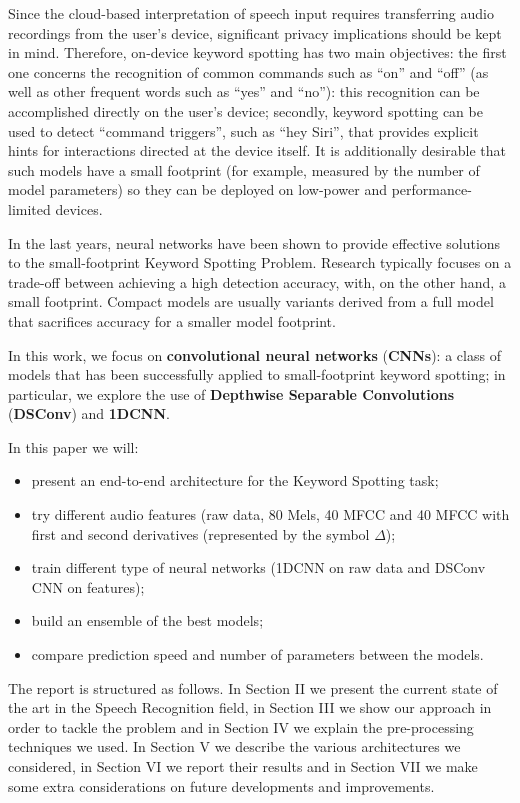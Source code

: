 \documentclass[conference]{IEEEtran}
\begin{document}
Since the cloud-based interpretation of speech input requires transferring audio recordings from the user’s device, significant privacy implications should be kept in mind. Therefore, on-device keyword spotting has two main objectives: the first one concerns the recognition of common commands such as “on” and “off” (as well as other frequent words such as “yes” and “no”): this recognition can be accomplished directly on the user’s device; secondly, keyword spotting can be used to detect “command triggers”, such as “hey Siri”, that provides explicit hints for interactions directed at the device itself. It is additionally desirable that such models have a small footprint (for example, measured by the number of model parameters) so they can be deployed on low-power and performance-limited devices.

In the last years, neural networks have been shown to provide effective solutions to the small-footprint Keyword Spotting Problem. Research typically focuses on a trade-off between achieving a high detection accuracy, with, on the other hand, a small footprint. Compact models are usually variants derived from a full model that sacrifices accuracy for a smaller model footprint.

In this work, we focus on \textbf{convolutional neural networks} (\textbf{CNNs}): a class of models that has been successfully applied to small-footprint keyword spotting; in particular, we explore the use of \textbf{Depthwise Separable Convolutions} (\textbf{DSConv}) and \textbf{1DCNN}.

In this paper we will: 
\begin{itemize}
\setlength{\itemsep}{0pt}
  \setlength{\parskip}{0pt}
  \setlength{\parsep}{0pt}
\item present an end-to-end architecture for the Keyword Spotting task;
\item try different audio features (raw data, 80 Mels, 40 MFCC and 40 MFCC with first and second derivatives (represented by the symbol $\Delta$);
\item train different type of neural networks (1DCNN on raw data and DSConv CNN on features);
\item build an ensemble of the best models;
\item compare prediction speed and number of parameters between the models.
\end{itemize}

The report is structured as follows. In Section II we present the current state of the art in the Speech Recognition field, in Section III we show our approach in order to tackle the problem and in Section IV we explain the pre-processing techniques we used. In Section V we describe the various architectures we considered, in Section VI we report their results and in Section VII we make some extra considerations on future developments and improvements.
\end{document}
